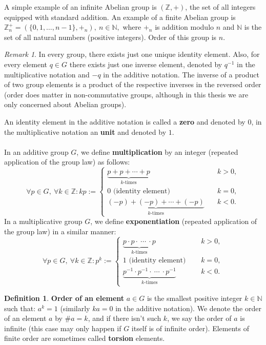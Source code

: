 \documentclass[thesis=M,english]{FITthesis}[2012/10/20]
\theoremstyle{remark}
\newtheorem*{RM}{Remark}
\theoremstyle{definition}
\newtheorem{DF}{Definition}[section]
\begin{document}
\noindent A simple example of an infinite Abelian group is $(\mathbb{Z}, +)$, the set of all integers equipped with standard addition. An example of a finite Abelian group is $\mathbb{Z}_n^+ = (\{0, 1, \ldots, n-1\}, +_{n}),\ n \in \mathbb{N},$ where $+_n$ is addition modulo $n$ and $\mathbb{N}$ is the set of all natural numbers (positive integers). Order of this group is $n$.
\begin{RM}
In every group, there exists just one unique identity element. Also, for every element $q \in G$ there exists just one inverse element, denoted by $q^{-1}$ in the multiplicative notation and $-q$ in the additive notation. The inverse of a product of two group elements is a product of the respective inverses in the reversed order (order does matter in non-commutative groups, although in this thesis we are only concerned about Abelian groups).
\end{RM}
\noindent An identity element in the additive notation is called a \textbf{zero} and denoted by $0$, in the multiplicative notation an \textbf{unit} and denoted by $1$. \\ \\
In an additive group $G$, we define \textbf{multiplication} by an integer (repeated application of the group law) as follows:
$$
\forall p \in G,\ \forall k \in \mathbb{Z}: kp := \begin{cases} \underbrace{p + p + \cdots + p}_{\text{$k$-times}} &\quad k > 0, \\
0 \text{ (identity element) } &\quad k = 0, \\
\underbrace{(-p) + (-p) + \cdots + (-p)}_{\text{$k$-times}} &\quad k < 0.
\end{cases}
$$
In a multiplicative group $G$, we define \textbf{exponentiation} (repeated application of the group law) in a similar manner:
$$
\forall p \in G,\ \forall k \in \mathbb{Z}: p^k := \begin{cases} \underbrace{p \cdot p \cdot\ \cdots\ \cdot  p}_{\text{$k$-times}} &\quad k > 0, \\
1 \text{ (identity element) } &\quad k = 0, \\
\underbrace{p^{-1} \cdot p^{-1} \cdot\ \cdots\ \cdot  p^{-1}}_{\text{$k$-times}} &\quad k < 0.
\end{cases}
$$
\begin{DF}
\textbf{Order of an element} $a \in G$ is the smallest positive integer $k \in \mathbb{N}$ such that: $a^k = 1$ (similarly $ka = 0$ in the additive notation). We denote the order of an element $a$ by $\#a= k$, and if there isn't such $k$, we say the order of $a$ is infinite (this case may only happen if $G$ itself is of infinite order). Elements of finite order are sometimes called \textbf{torsion} elements.
\end{DF}
\end{document}
